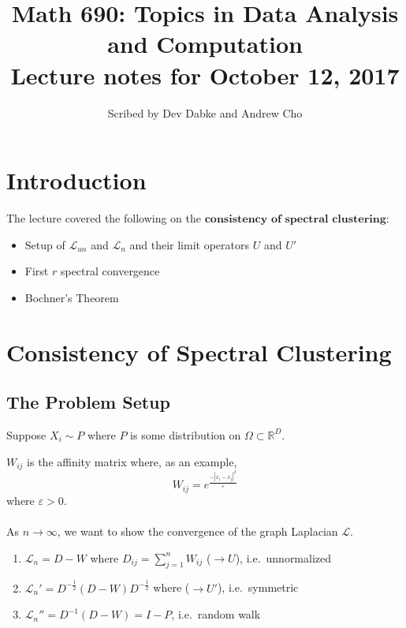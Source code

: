 \documentclass[12pt]{article}
\title{Math 690: Topics in Data Analysis and Computation \\
Lecture notes for October 12, 2017}
\date{}
\author{Scribed by Dev Dabke and Andrew Cho}
\theoremstyle{plain}
\begin{document}
\maketitle

\section{Introduction}
The lecture covered the following on the $\textbf{consistency of spectral clustering}$:
\begin{itemize}
	\item Setup of $\mathcal{L}_{un}$ and $\mathcal{L}_n$ and their limit operators $U$ and $U'$
	\item First $r$ spectral convergence
	\item Bochner's Theorem
\end{itemize}

\section{Consistency of Spectral Clustering}

\subsection{The Problem Setup}

Suppose $ X_{i} \sim P $ where $ P $ is some distribution on $ \Omega \subset \mathbb{R}^{D} $.

$ W_{ij} $ is the affinity matrix where, as an example,
\[
W_{ij} = e^{\frac{-|x_i - x_j|^2}{\varepsilon}}
\]
where $ \varepsilon > 0 $.
\\ \\
As $ n \to \infty $, we want to show the convergence of the graph Laplacian $ \mathcal{L} $.
\begin{enumerate}
  \item $ \mathcal{L}_{n} = D - W $ where $ D_{ij} = \sum_{j = 1}^{n} W_{ij} $ ($  \to U $), i.e.\ unnormalized
  \item $ \mathcal{L}_{n}' = D^{-\frac{1}{2}} (D - W) D^{-\frac{1}{2}} $ where ($  \to U' $), i.e.\ symmetric
  \item $ \mathcal{L}_{n}'' = D^{-1} (D - W) = I - P $, i.e.\ random walk
\end{enumerate}
\end{document}
